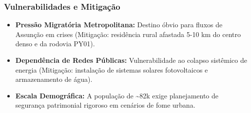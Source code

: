 \subsubsection{Vulnerabilidades e
Mitigação}

\begin{itemize}
\tightlist
\item
  \textbf{Pressão Migratória Metropolitana:} Destino óbvio para fluxos
  de Assunção em crises (Mitigação: residência rural afastada 5-10 km do
  centro denso e da rodovia PY01).
\item
  \textbf{Dependência de Redes Públicas:} Vulnerabilidade ao colapso
  sistêmico de energia (Mitigação: instalação de sistemas solares
  fotovoltaicos e armazenamento de água).
\item
  \textbf{Escala Demográfica:} A população de \textasciitilde82k exige
  planejamento de segurança patrimonial rigoroso em cenários de fome
  urbana.
\end{itemize}

